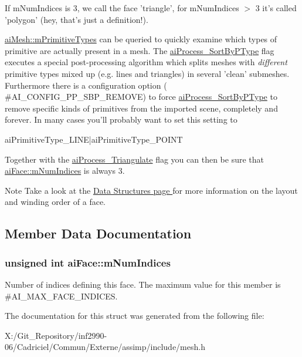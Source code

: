 If m\-Num\-Indices is 3, we call the face 'triangle', for m\-Num\-Indices $>$ 3 it's called 'polygon' (hey, that's just a definition!). \par
 \hyperlink{structai_mesh_a99d66ac0a444068c1b252b30265cbf53}{ai\-Mesh\-::m\-Primitive\-Types} can be queried to quickly examine which types of primitive are actually present in a mesh. The \hyperlink{postprocess_8h_a64795260b95f5a4b3f3dc1be4f52e410ab4484f73635d633cd79973bac1431ed6}{ai\-Process\-\_\-\-Sort\-By\-P\-Type} flag executes a special post-\/processing algorithm which splits meshes with {\itshape different} primitive types mixed up (e.\-g. lines and triangles) in several 'clean' submeshes. Furthermore there is a configuration option ( \#\-A\-I\-\_\-\-C\-O\-N\-F\-I\-G\-\_\-\-P\-P\-\_\-\-S\-B\-P\-\_\-\-R\-E\-M\-O\-V\-E) to force \hyperlink{postprocess_8h_a64795260b95f5a4b3f3dc1be4f52e410ab4484f73635d633cd79973bac1431ed6}{ai\-Process\-\_\-\-Sort\-By\-P\-Type} to remove specific kinds of primitives from the imported scene, completely and forever. In many cases you'll probably want to set this setting to 
\begin{DoxyCode}
aiPrimitiveType\_LINE|aiPrimitiveType\_POINT
\end{DoxyCode}
 Together with the \hyperlink{postprocess_8h_a64795260b95f5a4b3f3dc1be4f52e410a9c3de834f0307f31fa2b1b6d05dd592b}{ai\-Process\-\_\-\-Triangulate} flag you can then be sure that \hyperlink{structai_face_adda2698cec0ebfe651572f4a5701360b}{ai\-Face\-::m\-Num\-Indices} is always 3. \begin{DoxyNote}{Note}
Take a look at the \hyperlink{}{Data Structures page } for more information on the layout and winding order of a face. 
\end{DoxyNote}


\subsection{Member Data Documentation}
\hypertarget{structai_face_adda2698cec0ebfe651572f4a5701360b}{
\subsubsection[{m\-Num\-Indices}]{\setlength{\rightskip}{0pt plus 5cm}unsigned int ai\-Face\-::m\-Num\-Indices}}\label{structai_face_adda2698cec0ebfe651572f4a5701360b}
Number of indices defining this face. The maximum value for this member is \#\-A\-I\-\_\-\-M\-A\-X\-\_\-\-F\-A\-C\-E\-\_\-\-I\-N\-D\-I\-C\-E\-S. 

The documentation for this struct was generated from the following file\-:\begin{DoxyCompactItemize}
\item 
X\-:/\-Git\-\_\-\-Repository/inf2990-\/06/\-Cadriciel/\-Commun/\-Externe/assimp/include/mesh.\-h\end{DoxyCompactItemize}
